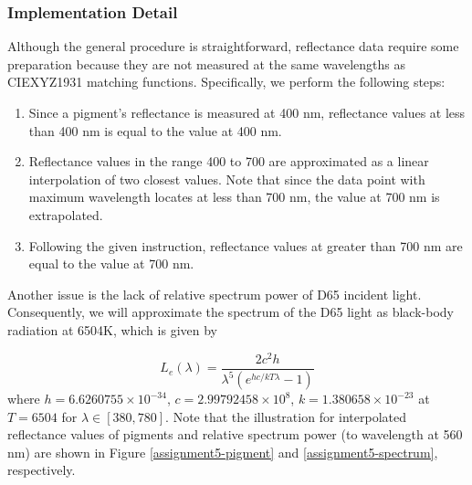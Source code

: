 \subsubsection{Implementation Detail}

Although the general procedure is straightforward, reflectance data require some preparation because they are not measured at the same wavelengths as CIEXYZ1931 matching functions. Specifically, we perform the following steps:
\begin{enumerate}
    \item Since a pigment's reflectance is measured at 400 nm, reflectance values at less than 400 nm is equal to the value at 400 nm.
    \item Reflectance values in the range 400 to 700 are approximated as a linear interpolation of two closest values. Note that since the data point with maximum wavelength locates at less than 700 nm, the value at 700 nm is extrapolated.
    \item Following the given instruction, reflectance values at greater than 700 nm are equal to the value at 700 nm. 
\end{enumerate}

Another issue is the lack of relative spectrum power of D65 incident light. Consequently, we will approximate the spectrum of the D65 light as black-body radiation at 6504K, which is given by

\begin{equation}
L_e(\lambda) = \frac{2c^2h}{\lambda^5(e^{hc / kT\lambda} - 1)}
\end{equation}
where $h = 6.6260755 \times 10^{-34}$, $c = 2.99792458 \times 10^8$, $k = 1.380658 \times 10^{-23}$ at $T = 6504$ for $\lambda \in [380,780]$. Note that the illustration for interpolated reflectance values of pigments and relative spectrum power (to wavelength at 560 nm) are shown in Figure \ref{assignment5-pigment} and \ref{assignment5-spectrum}, respectively.

